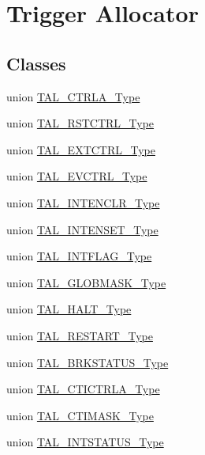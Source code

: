 \hypertarget{group___s_a_m_l21___t_a_l}{}\section{Trigger Allocator}
\label{group___s_a_m_l21___t_a_l}
\subsection*{Classes}
\begin{DoxyCompactItemize}
\item 
union \hyperlink{union_t_a_l___c_t_r_l_a___type}{T\+A\+L\+\_\+\+C\+T\+R\+L\+A\+\_\+\+Type}
\item 
union \hyperlink{union_t_a_l___r_s_t_c_t_r_l___type}{T\+A\+L\+\_\+\+R\+S\+T\+C\+T\+R\+L\+\_\+\+Type}
\item 
union \hyperlink{union_t_a_l___e_x_t_c_t_r_l___type}{T\+A\+L\+\_\+\+E\+X\+T\+C\+T\+R\+L\+\_\+\+Type}
\item 
union \hyperlink{union_t_a_l___e_v_c_t_r_l___type}{T\+A\+L\+\_\+\+E\+V\+C\+T\+R\+L\+\_\+\+Type}
\item 
union \hyperlink{union_t_a_l___i_n_t_e_n_c_l_r___type}{T\+A\+L\+\_\+\+I\+N\+T\+E\+N\+C\+L\+R\+\_\+\+Type}
\item 
union \hyperlink{union_t_a_l___i_n_t_e_n_s_e_t___type}{T\+A\+L\+\_\+\+I\+N\+T\+E\+N\+S\+E\+T\+\_\+\+Type}
\item 
union \hyperlink{union_t_a_l___i_n_t_f_l_a_g___type}{T\+A\+L\+\_\+\+I\+N\+T\+F\+L\+A\+G\+\_\+\+Type}
\item 
union \hyperlink{union_t_a_l___g_l_o_b_m_a_s_k___type}{T\+A\+L\+\_\+\+G\+L\+O\+B\+M\+A\+S\+K\+\_\+\+Type}
\item 
union \hyperlink{union_t_a_l___h_a_l_t___type}{T\+A\+L\+\_\+\+H\+A\+L\+T\+\_\+\+Type}
\item 
union \hyperlink{union_t_a_l___r_e_s_t_a_r_t___type}{T\+A\+L\+\_\+\+R\+E\+S\+T\+A\+R\+T\+\_\+\+Type}
\item 
union \hyperlink{union_t_a_l___b_r_k_s_t_a_t_u_s___type}{T\+A\+L\+\_\+\+B\+R\+K\+S\+T\+A\+T\+U\+S\+\_\+\+Type}
\item 
union \hyperlink{union_t_a_l___c_t_i_c_t_r_l_a___type}{T\+A\+L\+\_\+\+C\+T\+I\+C\+T\+R\+L\+A\+\_\+\+Type}
\item 
union \hyperlink{union_t_a_l___c_t_i_m_a_s_k___type}{T\+A\+L\+\_\+\+C\+T\+I\+M\+A\+S\+K\+\_\+\+Type}
\item 
union \hyperlink{union_t_a_l___i_n_t_s_t_a_t_u_s___type}{T\+A\+L\+\_\+\+I\+N\+T\+S\+T\+A\+T\+U\+S\+\_\+\+Type}

\end{DoxyCompactItemize}
